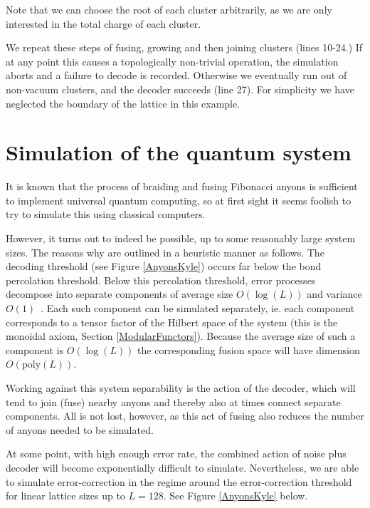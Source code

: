 Note that we can choose the root of each cluster arbitrarily,
as we are only interested in the total charge of each cluster.

We repeat these steps of fusing, growing and then joining clusters (lines 10-24.)
If at any point this causes a topologically 
non-trivial operation, the simulation aborts and a failure
to decode is recorded.
Otherwise we eventually run out
of non-vacuum clusters, and the decoder succeeds (line 27).
For simplicity we have neglected the boundary of the lattice in
this example.


%
%

\section{Simulation of the quantum system}

It is known that the process of braiding and fusing
Fibonacci anyons is sufficient to implement universal quantum
computing, so at first sight it seems foolish to try to simulate
this using classical computers. %

However, it turns out to indeed be possible, up to some reasonably
large system sizes. 
The reasons why are outlined in a heuristic manner as follows.
The decoding threshold (see Figure \ref{AnyonsKyle})
occurs far below the bond percolation threshold.
Below this percolation threshold, error processes 
decompose into separate components of
average size $O(\log(L))$ and variance $O(1)$~\cite{Bazant2000}.
Each such component can be simulated separately, ie.
each component corresponds to a tensor factor of the
Hilbert space of the system 
(this is the monoidal axiom, Section \ref{ModularFunctors}).
Because the average size of such a component
is $O(\log(L))$ the corresponding fusion space will have 
dimension $O(\mathrm{poly}(L)).$

Working against this system separability is the
action of the decoder, which will tend to join (fuse)
nearby anyons and thereby also at times connect separate
components. 
All is not lost, however, as this act of fusing also
reduces the number of anyons needed to be simulated.

At some point, with high enough error rate, the combined action of
noise plus decoder will become exponentially difficult to simulate.
Nevertheless, we are able to simulate error-correction in
the regime around the error-correction threshold for linear lattice sizes up to $L=128$.
See Figure \ref{AnyonsKyle} below.

